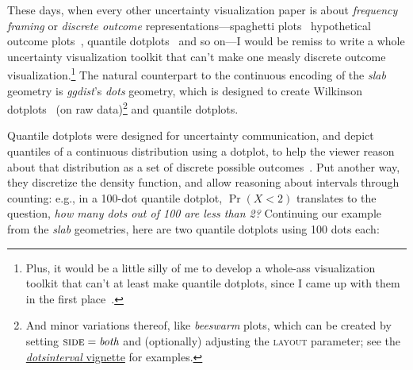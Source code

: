 \documentclass[journal]{vgtc}              %
\begin{document}
These days, when every other uncertainty visualization paper is about \textit{frequency framing} or \textit{discrete outcome} representations---spaghetti plots~\cite{cox2013visualizing,liu2018visualizing} hypothetical outcome plots~\cite{hullman2015hypothetical,kale2018hypothetical}, quantile dotplots~\cite{kay2016ish,fernandes2018uncertainty} and so on---I would be remiss to write a whole uncertainty visualization toolkit that can't make one measly discrete outcome visualization.\footnote{Plus, it would be a little silly of me to develop a whole-ass visualization toolkit that can't at least make quantile dotplots, since I came up with them in the first place~\cite{kay2016ish}.} The natural counterpart to the continuous encoding of the \textit{slab} geometry is \textit{ggdist}'s \textit{dots} geometry, which is designed to create Wilkinson dotplots~\cite{wilkinson1999dot} (on raw data)\footnote{And minor variations thereof, like \textit{beeswarm} plots, which can be created by setting $\textsc{side} = \textit{both}$ and (optionally) adjusting the \textsc{layout} parameter; see the \href{https://mjskay.github.io/ggdist/articles/dotsinterval.html}{\textit{dotsinterval} vignette} for examples.} and quantile dotplots.

Quantile dotplots were designed for uncertainty communication, and depict quantiles of a continuous distribution using a dotplot, to help the viewer reason about that distribution as a set of discrete possible outcomes~\cite{kay2016ish}. Put another way, they discretize the density function, and allow reasoning about intervals through counting: e.g., in a 100-dot quantile dotplot, $\Pr(X < 2)$ translates to the question, \textit{how many dots out of 100 are less than 2?} Continuing our example from the \textit{slab} geometries, here are two quantile dotplots using 100 dots each:
\end{document}

